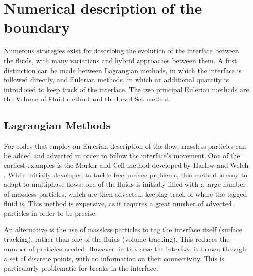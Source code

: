 \documentclass[11pt, a4paper, oneside, openany]{book}
\begin{document}
\section{Numerical description of the boundary}
Numerous strategies exist for describing the evolution of the interface between the fluids, with many variations and hybrid approaches between them. A first distinction can be made between Lagrangian methods, in which the interface is followed directly, and Eulerian methods, in which an additional quantity is introduced to keep track of the interface. The two principal Eulerian methods are the Volume-of-Fluid method and the Level Set method.
\subsection{Lagrangian Methods}
For codes that employ an Eulerian description of the flow, massless particles can be added and advected in order to follow the interface's movement. One of the earliest examples is the Marker and Cell method developed by Harlow and Welch \cite{harlow1965numerical}. While initially developed to tackle free-surface problems, this method is easy to adapt to multiphase flows: one of the fluids is initially filled with a large number of massless particles, which are then advected, keeping track of where the tagged fluid is. This method is expensive, as it requires a great number of advected particles in order to be precise.\par

An alternative is the use of massless particles to tag the interface itself (surface tracking), rather than one of the fluids (volume tracking). This reduces the number of particles needed. However, in this case the interface is known through a set of discrete points, with no information on their connectivity. This is particularly problematic for breaks in the interface.\par
\end{document}
